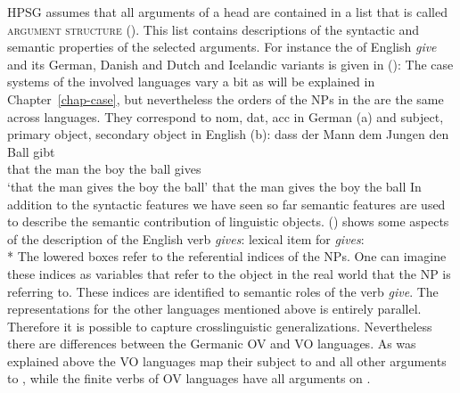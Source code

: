 HPSG assumes that all arguments of a head are contained in a list that is called \textsc{argument
  structure} (\argst). This list contains descriptions of the syntactic and semantic properties of
the selected arguments. For instance the \argstl of English \emph{give} and its German, Danish and
Dutch and Icelandic variants is given in ():
\ea
{}
\z
The case systems of the involved languages vary a bit as will be explained in
Chapter~\ref{chap-case}, but nevertheless the orders of the NPs in the \argstl are the same across
languages. They correspond to nom, dat, acc in German (a) and subject, primary object, secondary object
in English (b):
\eal
\ex dass der Mann dem Jungen den Ball gibt\\
    that the man  the boy    the ball gives\\
\glt `that the man gives the boy the ball'
\ex that the man gives the boy the ball
\zl
In addition to the syntactic features we have seen so far semantic features are used to describe the
semantic contribution of linguistic objects. () shows some aspects of the description of the English verb
\emph{gives}:
\ea
lexical item for \emph{gives}:\\*
\z
The lowered boxes refer to the referential indices of the NPs. One can imagine these indices as
variables that refer to the object in the real world that the NP is referring to. These indices are
identified to semantic roles of the verb \emph{give}. The representations for the other languages
mentioned above is entirely parallel. Therefore it is possible to capture crosslinguistic
generalizations. Nevertheless there are differences between the Germanic OV and VO languages. As was
explained above the VO languages map their subject to \spr and all other arguments to \comps, while
the finite verbs of OV languages have all arguments on \comps.



